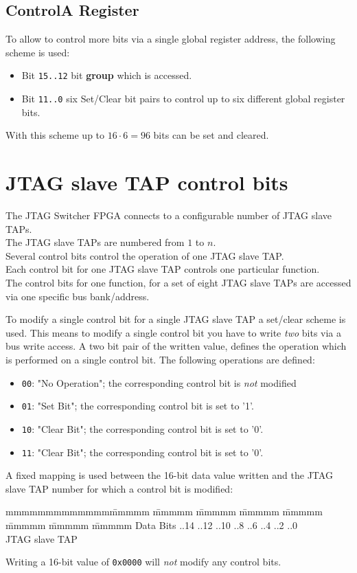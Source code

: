 \documentclass[10pt,english,a4paper]{report}
\begin{document}
\subsection{ControlA Register}
To allow to control more bits via a single global register address, the
following scheme is used:
\begin{itemize}
\item Bit {\tt 15..12} bit {\bf group} which is accessed.
\item Bit {\tt 11..0} six Set/Clear bit pairs to control up to six different global register bits.
\end{itemize}
With this scheme up to $16\cdot 6 = 96$ bits can be set and cleared.

\newpage
\section{JTAG slave TAP control bits}
The JTAG Switcher FPGA connects to a configurable number of JTAG slave TAPs.\\
The JTAG slave TAPs are numbered from $1$ to $n$.\\
Several control bits control the operation of one JTAG slave TAP.\\
Each control bit for one JTAG slave TAP controls one particular function.\\
The control bits for one function, for a set of eight JTAG slave TAPs
are accessed via one specific bus bank/address.

To modify a single control bit for a single JTAG slave TAP a set/clear scheme is used.
This means to modify a single control bit you have to write {\em two} bits via a bus write access.
A two bit pair of the written value, defines the operation which is performed on a single control bit.
The following operations are defined:
\begin{itemize}
\item {\tt 00}: "No Operation"; the corresponding control bit is {\em not} modified
\item {\tt 01}: "Set Bit"; the corresponding control bit is set to '1'.
\item {\tt 10}: "Clear Bit"; the corresponding control bit is set to '0'.
\item {\tt 11}: "Clear Bit"; the corresponding control bit is set to '0'.
\end{itemize}

A fixed mapping is used between the 16-bit data value written and
the JTAG slave TAP number for which a control bit is modified:
\begin{tabbing}
mmmmmmmmmmmmm\= mmmmm \= mmmmm \= mmmmm \= mmmmm \= mmmmm \= mmmmm \= mmmmm \= mmmmm \kill
Data Bits     ..14 ..12 ..10 ..8 ..6 ..4 ..2 ..0 \\
JTAG slave TAP          \\
\end{tabbing}
Writing a 16-bit value of {\tt 0x0000} will {\em not} modify any control bits.
\end{document}
